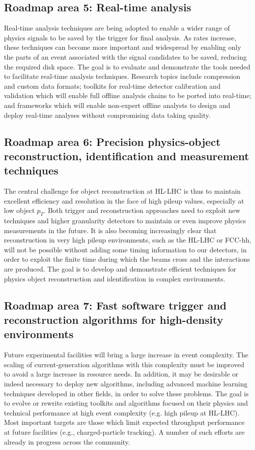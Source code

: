 \subsection{Roadmap area 5: Real-time analysis }

Real-time analysis techniques are being adopted to enable a wider range of physics signals to be saved by the trigger for final analysis. As rates increase, these techniques can become more important and widespread by enabling only the parts of an event associated with the signal candidates to be saved, reducing the required disk space. The goal is to evaluate and demonstrate the tools needed to facilitate real-time analysis techniques. Research topics include compression and custom data formats; toolkits for real-time detector calibration and validation which will enable full offline analysis chains to be ported into real-time; and frameworks which will enable non-expert offline analysts to design and deploy real-time analyses without compromising data taking quality. 

\subsection{Roadmap area 6: Precision physics-object reconstruction, identification and measurement techniques}

The central challenge for object reconstruction at HL-LHC is thus to maintain excellent efficiency and resolution in the face of high pileup values, especially at low object $p_T$. Both trigger and reconstruction approaches need to exploit new techniques and higher granularity detectors to maintain or even improve physics measurements in the future. It is also becoming increasingly clear that reconstruction in very high pileup environments, such as the HL-LHC or FCC-hh, will not be possible without adding some timing information to our detectors, in order to exploit the finite time during which the beams cross and the interactions are produced. The goal is to develop and demonstrate efficient techniques for physics object reconstruction and identification in complex environments.

\subsection{Roadmap area 7: Fast software trigger and reconstruction algorithms for high-density environments }

Future experimental facilities will bring a large increase in event complexity. The scaling of current-generation algorithms with this complexity must be improved to avoid a large increase in resource needs. In addition, it may be desirable or indeed necessary to deploy new algorithms, including advanced machine learning techniques developed in other fields, in order to solve these problems. The goal is to evolve or rewrite existing toolkits and algorithms focused on their physics and technical performance at high event complexity (e.g. high pileup at HL-LHC). Most important targets are those which limit expected throughput performance at future facilities (e.g., charged-particle tracking). A number of such efforts are already in progress across the community.

